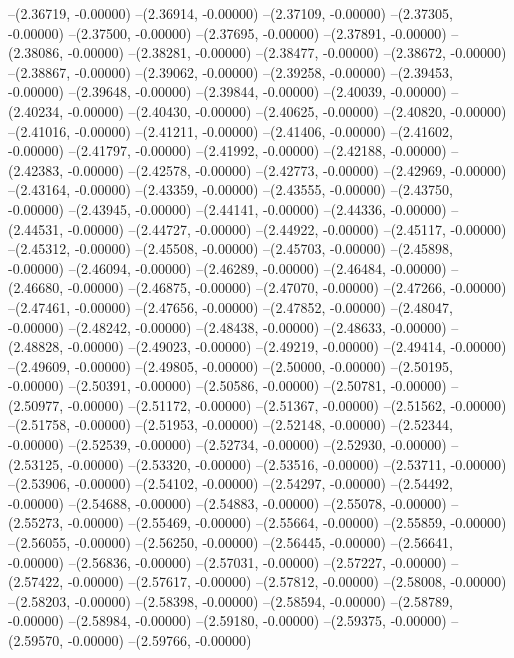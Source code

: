 --(2.36719, -0.00000)
--(2.36914, -0.00000)
--(2.37109, -0.00000)
--(2.37305, -0.00000)
--(2.37500, -0.00000)
--(2.37695, -0.00000)
--(2.37891, -0.00000)
--(2.38086, -0.00000)
--(2.38281, -0.00000)
--(2.38477, -0.00000)
--(2.38672, -0.00000)
--(2.38867, -0.00000)
--(2.39062, -0.00000)
--(2.39258, -0.00000)
--(2.39453, -0.00000)
--(2.39648, -0.00000)
--(2.39844, -0.00000)
--(2.40039, -0.00000)
--(2.40234, -0.00000)
--(2.40430, -0.00000)
--(2.40625, -0.00000)
--(2.40820, -0.00000)
--(2.41016, -0.00000)
--(2.41211, -0.00000)
--(2.41406, -0.00000)
--(2.41602, -0.00000)
--(2.41797, -0.00000)
--(2.41992, -0.00000)
--(2.42188, -0.00000)
--(2.42383, -0.00000)
--(2.42578, -0.00000)
--(2.42773, -0.00000)
--(2.42969, -0.00000)
--(2.43164, -0.00000)
--(2.43359, -0.00000)
--(2.43555, -0.00000)
--(2.43750, -0.00000)
--(2.43945, -0.00000)
--(2.44141, -0.00000)
--(2.44336, -0.00000)
--(2.44531, -0.00000)
--(2.44727, -0.00000)
--(2.44922, -0.00000)
--(2.45117, -0.00000)
--(2.45312, -0.00000)
--(2.45508, -0.00000)
--(2.45703, -0.00000)
--(2.45898, -0.00000)
--(2.46094, -0.00000)
--(2.46289, -0.00000)
--(2.46484, -0.00000)
--(2.46680, -0.00000)
--(2.46875, -0.00000)
--(2.47070, -0.00000)
--(2.47266, -0.00000)
--(2.47461, -0.00000)
--(2.47656, -0.00000)
--(2.47852, -0.00000)
--(2.48047, -0.00000)
--(2.48242, -0.00000)
--(2.48438, -0.00000)
--(2.48633, -0.00000)
--(2.48828, -0.00000)
--(2.49023, -0.00000)
--(2.49219, -0.00000)
--(2.49414, -0.00000)
--(2.49609, -0.00000)
--(2.49805, -0.00000)
--(2.50000, -0.00000)
--(2.50195, -0.00000)
--(2.50391, -0.00000)
--(2.50586, -0.00000)
--(2.50781, -0.00000)
--(2.50977, -0.00000)
--(2.51172, -0.00000)
--(2.51367, -0.00000)
--(2.51562, -0.00000)
--(2.51758, -0.00000)
--(2.51953, -0.00000)
--(2.52148, -0.00000)
--(2.52344, -0.00000)
--(2.52539, -0.00000)
--(2.52734, -0.00000)
--(2.52930, -0.00000)
--(2.53125, -0.00000)
--(2.53320, -0.00000)
--(2.53516, -0.00000)
--(2.53711, -0.00000)
--(2.53906, -0.00000)
--(2.54102, -0.00000)
--(2.54297, -0.00000)
--(2.54492, -0.00000)
--(2.54688, -0.00000)
--(2.54883, -0.00000)
--(2.55078, -0.00000)
--(2.55273, -0.00000)
--(2.55469, -0.00000)
--(2.55664, -0.00000)
--(2.55859, -0.00000)
--(2.56055, -0.00000)
--(2.56250, -0.00000)
--(2.56445, -0.00000)
--(2.56641, -0.00000)
--(2.56836, -0.00000)
--(2.57031, -0.00000)
--(2.57227, -0.00000)
--(2.57422, -0.00000)
--(2.57617, -0.00000)
--(2.57812, -0.00000)
--(2.58008, -0.00000)
--(2.58203, -0.00000)
--(2.58398, -0.00000)
--(2.58594, -0.00000)
--(2.58789, -0.00000)
--(2.58984, -0.00000)
--(2.59180, -0.00000)
--(2.59375, -0.00000)
--(2.59570, -0.00000)
--(2.59766, -0.00000)
